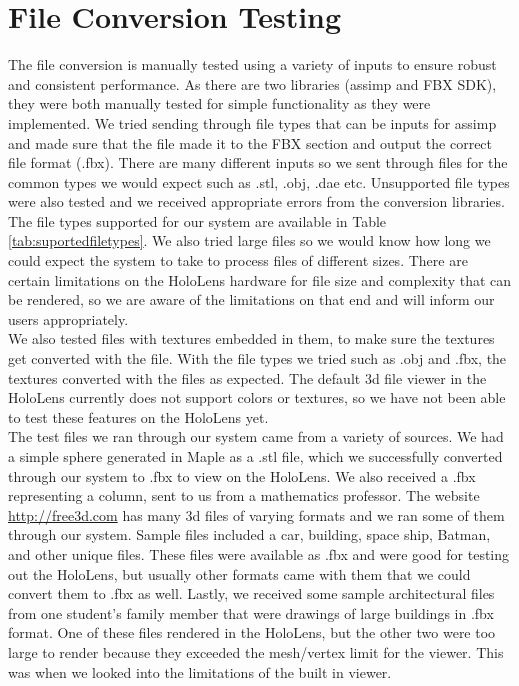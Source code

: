 
\section{File Conversion Testing}
\tab
    The file conversion is manually tested using a variety of inputs to ensure robust and consistent performance. As there are two libraries (assimp and FBX SDK), they were both manually tested for simple functionality as they were implemented. We tried sending through file types that can be inputs for assimp and made sure that the file made it to the FBX section and output the correct file format (.fbx). There are many different inputs so we sent through files for the common types we would expect such as .stl, .obj, .dae etc. Unsupported file types were also tested and we received appropriate errors from the conversion libraries. The file types supported for our system are available in Table \ref{tab:suportedfiletypes}. We also tried large files so we would know how long we could expect the system to take to process files of different sizes. There are certain limitations on the HoloLens hardware for file size and complexity that can be rendered, so we are aware of the limitations on that end and will inform our users appropriately.\\ 
    
    We also tested files with textures embedded in them, to make sure the textures get converted with the file. With the file types we tried such as .obj and .fbx, the textures converted with the files as expected. The default 3d file viewer in the HoloLens currently does not support colors or textures, so we have not been able to test these features on the HoloLens yet.\\

    The test files we ran through our system came from a variety of sources. We had a simple sphere generated in Maple as a .stl file, which we successfully converted through our system to .fbx to view on the HoloLens. We also received a .fbx representing a column, sent to us from a mathematics professor. The website \url{http://free3d.com} has many 3d files of varying formats and we ran some of them through our system. Sample files included a car, building, space ship, Batman, and other unique files. These files were available as .fbx and were good for testing out the HoloLens, but usually other formats came with them that we could convert them to .fbx as well. Lastly, we received some sample architectural files from one student's family member that were drawings of large buildings in .fbx format. One of these files rendered in the HoloLens, but the other two were too large to render because they exceeded the mesh/vertex limit for the viewer. This was when we looked into the limitations of the built in viewer.\\


